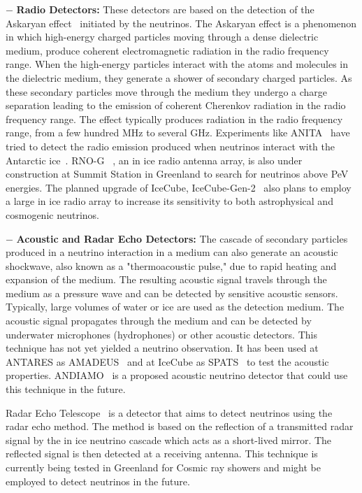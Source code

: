 \begin{description}
  \item $-$ \textbf{Radio Detectors:} These detectors are based on the detection of the Askaryan effect~\cite{Askaryan:1961pfb,PhysRevD.84.103003} initiated by the neutrinos. The Askaryan effect is a phenomenon in which high-energy charged particles moving through a dense dielectric medium, produce coherent electromagnetic radiation in the radio frequency range.  When the high-energy particles interact with the atoms and molecules in the dielectric medium, they generate a shower of secondary charged particles. As these secondary particles move through the medium they undergo a charge separation leading to the emission of coherent Cherenkov radiation in the radio frequency range. The effect typically produces radiation in the radio frequency range, from a few hundred \gls{MHz} to several \gls{GHz}. Experiments like ANITA~\cite{ANITA:2008mzi} have tried to detect the radio emission produced when neutrinos interact with the Antarctic ice~\cite{Schoorlemmer_2016}. RNO-G ~\cite{Aguilar_2021}, an in ice radio antenna array, is also under construction at Summit Station in Greenland to search for neutrinos above PeV energies. The planned upgrade of IceCube, IceCube-Gen-2~\cite{Aartsen_2021_Gen-2} also plans to employ a large in ice radio array to increase its sensitivity to both astrophysical and cosmogenic neutrinos. 
  
  \item $-$ \textbf{Acoustic and Radar Echo Detectors:}  The cascade of secondary particles produced in a neutrino interaction in a medium can also generate an acoustic shockwave, also known as a "thermoacoustic pulse," due to rapid heating and expansion of the medium. The resulting acoustic signal travels through the medium as a pressure wave and can be detected by sensitive acoustic sensors. Typically, large volumes of water or ice are used as the detection medium. The acoustic signal propagates through the medium and can be detected by underwater microphones (hydrophones) or other acoustic detectors. This technique has not yet yielded a neutrino observation. It has been used at ANTARES as AMADEUS~\cite{LAHMANN2012S216} and at IceCube as SPATS~\cite{Karg_2012} to test the acoustic properties. ANDIAMO~\cite{Marinelli_2022} is a proposed acoustic neutrino detector that could use this technique in the future.
  
  Radar Echo Telescope~\cite{Prohira_2021} is a detector that aims to detect neutrinos using the radar echo method. The method is based on the reflection of a transmitted radar signal by the in ice neutrino cascade which acts as a short-lived mirror. The reflected signal is then detected at a receiving antenna. This technique is currently being tested in Greenland for Cosmic ray showers and might be employed to detect neutrinos in the future.


\end{description}
